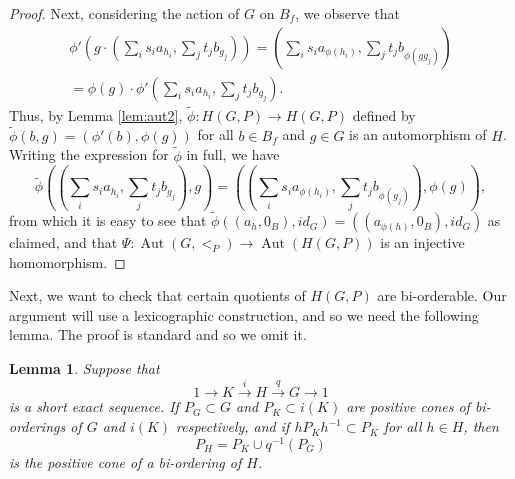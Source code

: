 \documentclass{amsart}
\newtheorem{lemma}[theorem]{Lemma}
\theoremstyle{definition}
\theoremstyle{remark}
\DeclareMathOperator{\Aut}{Aut}
\begin{document}
\begin{proof}
Next, considering the action of $G$ on $B_f$, we observe that
\begin{multline*} \phi'\left(g \cdot \left(\sum_i s_i a_{h_i} , \sum_j t_j b_{g_j} \right)\right) = \left(\sum_i s_i a_{\phi(h_i)} , \sum_j t_j b_{\phi(gg_j)} \right) \\
= \phi(g) \cdot \phi'\left(\sum_i s_i a_{h_i} , \sum_j t_j b_{g_j} \right).
\end{multline*}
Thus, by Lemma \ref{lem:aut2}, $\widetilde{\phi} : H(G, P) \rightarrow H(G,P)$ defined by $\widetilde{\phi}(b,g) = (\phi'(b), \phi(g))$ for all $b \in B_f$ and $g \in G$ is an automorphism of $H$. Writing the expression for $\widetilde{\phi}$ in full, we have
\[
 \widetilde\phi \left(\left(\sum_i s_i a_{h_i} , \sum_j t_j b_{g_j} \right), g \right) = \left(\left(\sum_i s_i a_{\phi(h_i)} , \sum_j t_j b_{\phi(g_j)} \right), \phi(g) \right), 
 \]
from which it is easy to see that $\widetilde\phi((a_h, 0_B), id_G) = ((a_{\phi(h)}, 0_B), id_G)$ as claimed, and that \(\Psi\colon \Aut(G, <_P) \to \Aut(H(G, P))\) is an injective homomorphism.
\end{proof}




Next, we want to check that certain quotients of $H(G,P)$ are bi-orderable.  Our argument will use a lexicographic construction, and so we need the following lemma. The proof is standard and so we omit it.

\begin{lemma}
\label{lem:boses}
Suppose that 
\[ 1 \longrightarrow K \stackrel{i}{\longrightarrow} H \stackrel{q}{\longrightarrow} G \longrightarrow 1
\]
is a short exact sequence.  If $P_G \subset G$ and $P_K \subset i(K)$ are positive cones of bi-orderings of $G$ and $i(K)$ respectively, and if $hP_Kh^{-1} \subset P_K$ for all $h \in H$, then 
\[ P_H = P_K \cup q^{-1}(P_G)
\]
is the positive cone of a bi-ordering of $H$.
\end{lemma}
\end{document}

